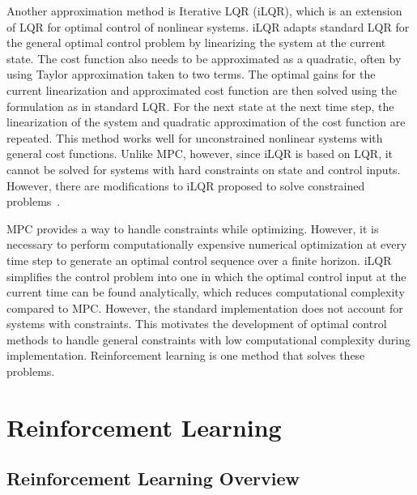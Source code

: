 Another approximation method is Iterative LQR (iLQR), which is an extension of LQR for optimal control of nonlinear systems.
iLQR adapts standard LQR for the general optimal control problem by linearizing the system at the current state. The cost function also needs to be approximated as a quadratic, often by using Taylor approximation taken to two terms. The optimal gains for the current linearization and approximated cost function are then solved using the formulation as in standard LQR. For the next state at the next time step, the linearization of the system and quadratic approximation of the cost function are repeated.
%
This method works well for unconstrained nonlinear systems with general cost functions. Unlike MPC, however, since iLQR is based on LQR, it cannot be solved for systems with hard constraints on state and control inputs. However, there are modifications to iLQR proposed to solve constrained problems~\cite{ChenJ:2019a}.

MPC provides a way to handle constraints while optimizing. However, it is necessary to perform computationally expensive numerical optimization at every time step to generate an optimal control sequence over a finite horizon. iLQR simplifies the control problem into one in which the optimal control input at the current time can be found analytically, which reduces computational complexity compared to MPC.
However, the standard implementation does not account for systems with constraints.
This motivates the development of optimal control methods to handle general constraints with low computational complexity during implementation. Reinforcement learning is one method that solves these problems.

\section{Reinforcement Learning}
\label{sec:RL_overview}
\subsection{Reinforcement Learning Overview}

